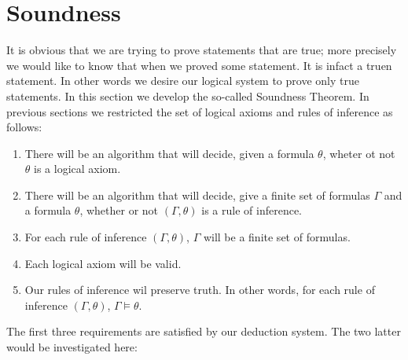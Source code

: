 \documentclass[9pt,a4paper]{article}
\begin{document}
    \section*{Soundness}
        It is obvious that we are trying to prove statements that are true; more precisely we would like to know that when we proved some statement. It is infact a truen statement. In other words we desire our logical system to prove only true statements. In this section we develop the so-called Soundness Theorem. In previous sections we restricted the set of logical axioms and rules of inference as follows:
        \begin{enumerate}
            \item There will be an algorithm that will decide, given a formula $\theta$, wheter ot not $\theta$ is a logical axiom.
            \item There will be an algorithm that will decide, give a finite set of formulas $\Gamma$ and a formula $\theta$, whether or not $(\Gamma,\theta)$ is a rule of inference.
            \item For each rule of inference $(\Gamma,\theta)$, $\Gamma$ will be a finite set of formulas.
            \item Each logical axiom will be valid.
            \item Our rules of inference wil preserve truth. In other words, for each rule of inference $(\Gamma, \theta)$, $\Gamma\vDash \theta$.
        \end{enumerate}
        The first three requirements are satisfied by our deduction system. The two latter would be investigated here:
\end{document}
